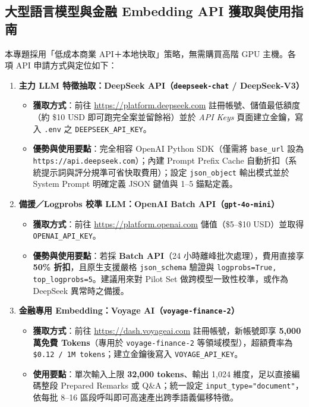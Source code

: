 \documentclass[11pt, a4paper]{article}
\begin{document}
\subsection{大型語言模型與金融 Embedding API 獲取與使用指南}

本專題採用「低成本商業 API＋本地快取」策略，無需購買高階 GPU 主機。各項 API 申請方式與定位如下：

\begin{enumerate}[leftmargin=1.5em, itemsep=3pt]
    \item \textbf{主力 LLM 特徵抽取：DeepSeek API（\texttt{deepseek-chat} / DeepSeek-V3）}
    \begin{itemize}[leftmargin=1.2em]
        \item \textbf{獲取方式}：前往 \url{https://platform.deepseek.com} 註冊帳號、儲值最低額度（約 \$10 USD 即可跑完全案並留餘裕）並於 \textit{API Keys} 頁面建立金鑰，寫入 \texttt{.env} 之 \texttt{DEEPSEEK\_API\_KEY}。
        \item \textbf{優勢與使用要點}：完全相容 OpenAI Python SDK（僅需將 \texttt{base\_url} 設為 \texttt{https://api.deepseek.com}）；內建 Prompt Prefix Cache 自動折扣（系統提示詞與評分規準可省快取費用）；設定 \texttt{json\_object} 輸出模式並於 System Prompt 明確定義 JSON 鍵值與 1--5 錨點定義。
    \end{itemize}
    \item \textbf{備援／Logprobs 校準 LLM：OpenAI Batch API（\texttt{gpt-4o-mini}）}
    \begin{itemize}[leftmargin=1.2em]
        \item \textbf{獲取方式}：前往 \url{https://platform.openai.com} 儲值（\$5--\$10 USD）並取得 \texttt{OPENAI\_API\_KEY}。
        \item \textbf{優勢與使用要點}：若採 \textbf{Batch API}（24 小時離峰批次處理），費用直接享 \textbf{50\% 折扣}，且原生支援嚴格 \texttt{json\_schema} 驗證與 \texttt{logprobs=True, top\_logprobs=5}。建議用來對 Pilot Set 做跨模型一致性校準，或作為 DeepSeek 異常時之備援。
    \end{itemize}
    \item \textbf{金融專用 Embedding：Voyage AI（\texttt{voyage-finance-2}）}
    \begin{itemize}[leftmargin=1.2em]
        \item \textbf{獲取方式}：前往 \url{https://dash.voyageai.com} 註冊帳號，新帳號即享 \textbf{5,000 萬免費 Tokens}（專用於 \texttt{voyage-finance-2} 等領域模型），超額費率為 \texttt{\$0.12 / 1M tokens}；建立金鑰後寫入 \texttt{VOYAGE\_API\_KEY}。
        \item \textbf{使用要點}：單次輸入上限 \textbf{32,000 tokens}、輸出 1,024 維度，足以直接編碼整段 Prepared Remarks 或 Q\&A；統一設定 \texttt{input\_type="document"}，依每批 8--16 區段呼叫即可高速產出跨季語義偏移特徵。
    \end{itemize}
\end{enumerate}
\end{document}
